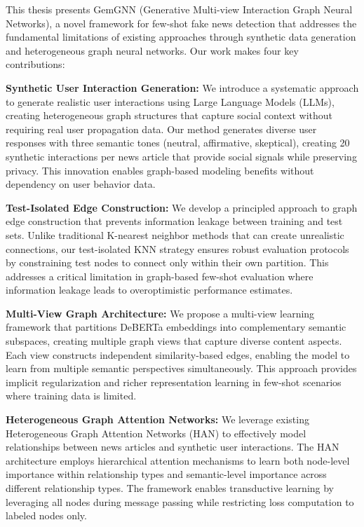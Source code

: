 This thesis presents GemGNN (Generative Multi-view Interaction Graph Neural Networks), a novel framework for few-shot fake news detection that addresses the fundamental limitations of existing approaches through synthetic data generation and heterogeneous graph neural networks. Our work makes four key contributions:

\textbf{Synthetic User Interaction Generation:} We introduce a systematic approach to generate realistic user interactions using Large Language Models (LLMs), creating heterogeneous graph structures that capture social context without requiring real user propagation data. Our method generates diverse user responses with three semantic tones (neutral, affirmative, skeptical), creating 20 synthetic interactions per news article that provide social signals while preserving privacy. This innovation enables graph-based modeling benefits without dependency on user behavior data.

\textbf{Test-Isolated Edge Construction:} We develop a principled approach to graph edge construction that prevents information leakage between training and test sets. Unlike traditional K-nearest neighbor methods that can create unrealistic connections, our test-isolated KNN strategy ensures robust evaluation protocols by constraining test nodes to connect only within their own partition. This addresses a critical limitation in graph-based few-shot evaluation where information leakage leads to overoptimistic performance estimates.

\textbf{Multi-View Graph Architecture:} We propose a multi-view learning framework that partitions DeBERTa embeddings into complementary semantic subspaces, creating multiple graph views that capture diverse content aspects. Each view constructs independent similarity-based edges, enabling the model to learn from multiple semantic perspectives simultaneously. This approach provides implicit regularization and richer representation learning in few-shot scenarios where training data is limited.

\textbf{Heterogeneous Graph Attention Networks:} We leverage existing Heterogeneous Graph Attention Networks (HAN) to effectively model relationships between news articles and synthetic user interactions. The HAN architecture employs hierarchical attention mechanisms to learn both node-level importance within relationship types and semantic-level importance across different relationship types. The framework enables transductive learning by leveraging all nodes during message passing while restricting loss computation to labeled nodes only.

